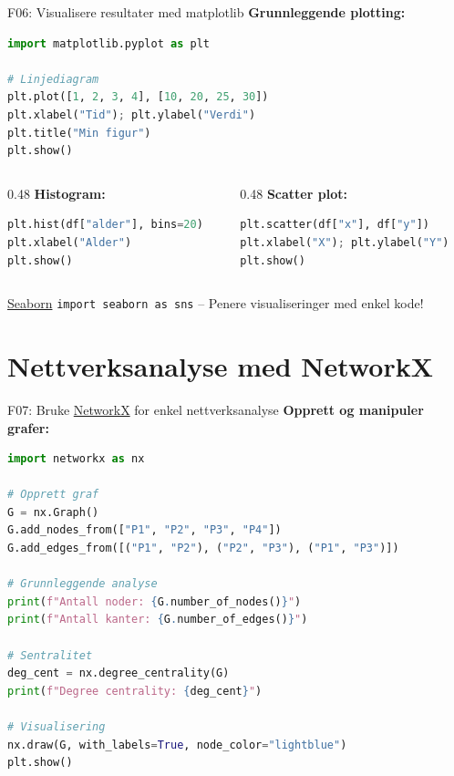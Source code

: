 \documentclass[aspectratio=169, 10pt]{beamer}
\begin{document}
\begin{frame}[fragile]{F06: Visualisere resultater med matplotlib}
    \textbf{Grunnleggende plotting:}
    \begin{lstlisting}[language=Python]
import matplotlib.pyplot as plt

# Linjediagram
plt.plot([1, 2, 3, 4], [10, 20, 25, 30])
plt.xlabel("Tid"); plt.ylabel("Verdi")
plt.title("Min figur")
plt.show()
    \end{lstlisting}
    
    \begin{columns}[T]
        \begin{column}{0.48\textwidth}
            \textbf{Histogram:}
            \begin{lstlisting}[language=Python]
plt.hist(df["alder"], bins=20)
plt.xlabel("Alder")
plt.show()
            \end{lstlisting}
        \end{column}
        \begin{column}{0.48\textwidth}
            \textbf{Scatter plot:}
            \begin{lstlisting}[language=Python]
plt.scatter(df["x"], df["y"])
plt.xlabel("X"); plt.ylabel("Y")
plt.show()
            \end{lstlisting}
        \end{column}
    \end{columns}
    
    \vspace{0.2cm}
    \begin{block}{\footnotesize \href{https://seaborn.pydata.org/}{Seaborn}}
        \footnotesize \texttt{import seaborn as sns} -- Penere visualiseringer med enkel kode!
    \end{block}
\end{frame}

\section{Nettverksanalyse med NetworkX}

\begin{frame}[fragile]{F07: Bruke \href{https://networkx.org/}{NetworkX} for enkel nettverksanalyse}
    \textbf{Opprett og manipuler grafer:}
    \begin{lstlisting}[language=Python]
import networkx as nx

# Opprett graf
G = nx.Graph()
G.add_nodes_from(["P1", "P2", "P3", "P4"])
G.add_edges_from([("P1", "P2"), ("P2", "P3"), ("P1", "P3")])

# Grunnleggende analyse
print(f"Antall noder: {G.number_of_nodes()}")
print(f"Antall kanter: {G.number_of_edges()}")

# Sentralitet
deg_cent = nx.degree_centrality(G)
print(f"Degree centrality: {deg_cent}")

# Visualisering
nx.draw(G, with_labels=True, node_color="lightblue")
plt.show()
    \end{lstlisting}
\end{frame}
\end{document}
